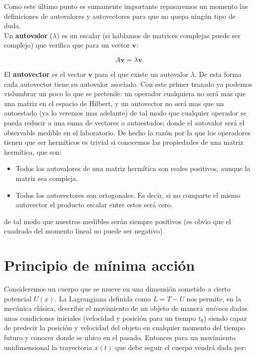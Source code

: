 \documentclass[12pt]{article}
\newcommand{\vn}{\mathbf{v}}
\begin{document}
Como este último punto es sumamente importante repasaremos un momento las definiciones de autovalores y autovectores para que no quepa ningún tipo de duda. \\

Un \textbf{autovalor} ($\lambda$) es un escalar (si hablamos de matrices complejas puede ser complejo) que verifica que para un vector $\vn$:

\begin{equation}
A \vn = \lambda \vn
\end{equation}

El \textbf{autovector} es el vector $\vn$ para el que existe un autovalor $\lambda$.  De esta forma cada autovector tiene su autovalor asociado. Con este primer trazado ya podemos vislumbrar un poco lo que se pretende: un operador cualquiera no será mas que una matriz en el espacio de Hilbert, y un autovector no será mas que un autoestado (ya lo veremos mas adelante) de tal modo que cualquier operador se pueda reducir a una suma de vectores o autoestados; donde el autovalor será el observable medible en el laboratorio. De hecho la razón por la que los operadores tienen que ser hermíticos es trivial si conocemos las propiedades de una matriz hermítica, que son:

\begin{itemize}
\item Todos los autovalores de una matriz hermítica son reales positivos, aunque la matriz sea compleja.
\item Todos los autovectores son ortogonales. Es decir, si no comparte el mismo autovector el producto escalar entre estos será cero.
\end{itemize}

de tal modo que nuestros medibles serán siempre positivos (es obvio que el cuadrado del momento lineal no puede ser negativo).

\newpage

\section{Principio de mínima acción}

Consideremos un cuerpo que se mueve en una dimensión sometido a cierto potencial $U(x)$. La Lagrangiana definida como $L=T-U$ nos permite, en la mecánica clásica, describir el movimiento de un objeto de manera \textit{unívoca} dadas unas condiciones iniciales (velocidad y posición para un tiempo $t_0$) siendo capaz de predecir la posición y velocidad del objeto en cualquier momento del tiempo futuro y conocer donde se ubico en el pasado. Entonces para un movimiento unidimensional la trayectoria $x(t)$ que debe seguir el cuerpo vendrá dada por:
\end{document}
